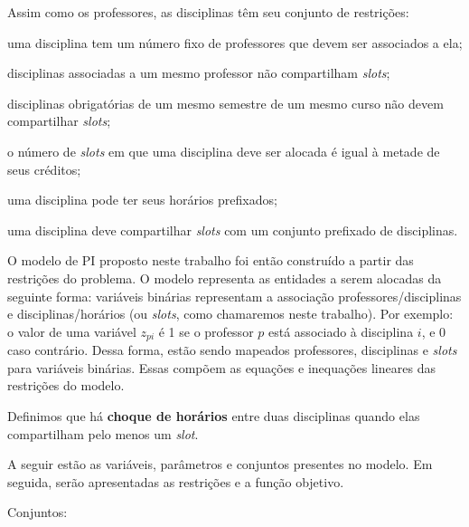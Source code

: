 Assim como os professores, as disciplinas têm seu conjunto de restrições:

\begin{alineascomponto}
\item uma disciplina tem um número fixo de professores que devem ser associados a ela;
\item disciplinas associadas a um mesmo professor não compartilham \textit{slots};
\item disciplinas obrigatórias de um mesmo semestre de um mesmo curso não devem compartilhar \textit{slots};
\item o número de \textit{slots} em que uma disciplina deve ser alocada é igual à metade de seus créditos;
\item uma disciplina pode ter seus horários prefixados;
\item uma disciplina deve compartilhar \textit{slots} com um conjunto prefixado de disciplinas.  
\end{alineascomponto} 

O modelo de PI proposto neste trabalho foi então construído a partir das restrições do problema. O modelo representa as entidades a serem alocadas da seguinte forma: variáveis binárias representam a associação professores/disciplinas e disciplinas/horários (ou \textit{slots}, como chamaremos neste trabalho). Por exemplo: o valor de uma variável $z_{pi}$ é 1 se o professor $p$ está associado à disciplina $i$, e 0 caso contrário. Dessa forma, estão sendo mapeados professores, disciplinas e \textit{slots} para variáveis binárias. Essas compõem as equações e inequações lineares das restrições do modelo.

Definimos que há \textbf{choque de horários} entre duas disciplinas quando elas compartilham pelo menos um \textit{slot}.

A seguir estão as variáveis, parâmetros e conjuntos presentes no modelo. Em seguida, serão apresentadas as restrições e a função objetivo.

Conjuntos:

